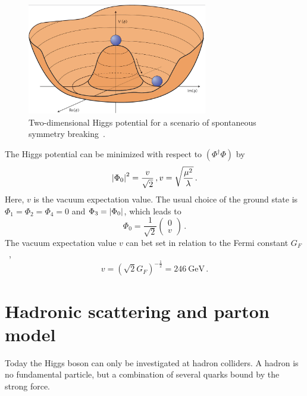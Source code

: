 \begin{figure}[tb]
    \centering
    \includegraphics[width=0.7\textwidth]{./figures/theory/higgs_potential.png}
    \caption{Two-dimensional Higgs potential for a scenario of spontaneous symmetry breaking~\cite{deBoer:2013pud}.}\label{fig:theory:sm:higgspotential}
\end{figure}

The Higgs potential can be minimized with respect to $\left(\Phi^\dagger\Phi\right)$ by
\begin{equation}
    \left|\Phi_0\right|^2 = \frac{v}{\sqrt{2}} \,, v = \sqrt{\frac{\mu^2}{\lambda}} \,.
\end{equation}
Here, $v$ is the vacuum expectation value.
The usual choice of the ground state is $\Phi_1 = \Phi_2 = \Phi_4 = 0$ and $\Phi_3 = \left|\Phi_0\right|$, which leads to
\begin{equation}
    \Phi_0 = \frac{1}{\sqrt{2}}
    \begin{pmatrix}
        0 \\ v
    \end{pmatrix} \,.
\end{equation}
The vacuum expectation value $v$ can bet set in relation to the Fermi constant $G_F$~\cite{PDG},
\begin{equation}
    v = {\left(\sqrt{2} G_F \right)}^{-\frac{1}{2}} = \SI{246}{\GeV} \,.
\end{equation}











\section{Hadronic scattering and parton model}\label{sec:theory:hadronscattering}

Today the Higgs boson can only be investigated at hadron colliders.
A hadron is no fundamental particle, but a combination of several quarks bound by the strong force.

